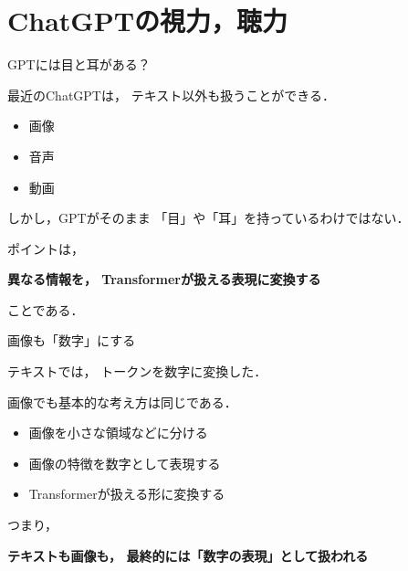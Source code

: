 \documentclass[aspectratio=169,professionalfonts]{beamer}
\begin{document}
\section{ChatGPTの視力，聴力}

\begin{frame}{GPTには目と耳がある？}

  最近のChatGPTは，
  テキスト以外も扱うことができる．

  \vspace{1em}

  \begin{itemize}
    \item 画像
    \item 音声
    \item 動画
  \end{itemize}

  \vspace{1em}

  しかし，GPTがそのまま
  「目」や「耳」を持っているわけではない．

  \vspace{1em}

  ポイントは，

  \begin{center}
    \textbf{異なる情報を，
    Transformerが扱える表現に変換する}
  \end{center}

  ことである．


\end{frame}


\begin{frame}{画像も「数字」にする}

  テキストでは，
  トークンを数字に変換した．

  \vspace{1em}

  画像でも基本的な考え方は同じである．

  \begin{itemize}
    \item 画像を小さな領域などに分ける
    \item 画像の特徴を数字として表現する
    \item Transformerが扱える形に変換する
  \end{itemize}

  \vspace{1em}

  つまり，

  \begin{center}
    \textbf{テキストも画像も，
    最終的には「数字の表現」として扱われる}
  \end{center}


\end{frame}
\end{document}
